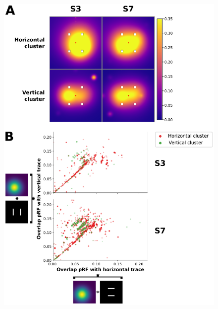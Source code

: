 \begin{figure}[htb!]
\captionsetup{labelformat=empty}
\centering
\includegraphics[width=\textwidth]{figures/chapter_03_SI/figS8.eps}
\caption{}
\end{figure}

